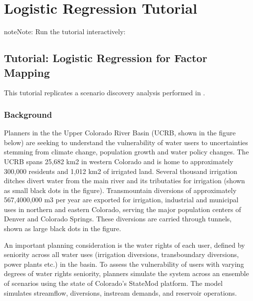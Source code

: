 \documentclass[letterpaper,10pt,english]{book}
\let\sphinxpxdimen\pdfpxdimen\else\newdimen\sphinxpxdimen
\begin{document}
\section{Logistic Regression Tutorial}
\label{\detokenize{A2_Jupyter_Notebooks:logistic-regression-tutorial}}
\begin{sphinxadmonition}{note}{Note:}
\sphinxAtStartPar
Run the tutorial interactively:  
\end{sphinxadmonition}


\subsection{Tutorial: Logistic Regression for Factor Mapping}
\label{\detokenize{A2_Jupyter_Notebooks:tutorial-logistic-regression-for-factor-mapping}}
\sphinxAtStartPar
This tutorial replicates a scenario discovery analysis performed in
.


\subsubsection{Background}
\label{\detokenize{A2_Jupyter_Notebooks:background}}
\sphinxAtStartPar
Planners in the the Upper Colorado River Basin (UCRB, shown in the
figure below) are seeking to understand the vulnerability of water users
to uncertainties stemming from climate change, population growth and
water policy changes. The UCRB spans 25,682 km2 in western Colorado and
is home to approximately 300,000 residents and 1,012 km2 of irrigated
land. Several thousand irrigation ditches divert water from the main
river and its tributaties for irrigation (shown as small black dots in
the figure). Transmountain diversions of approximately 567,4000,000 m3
per year are exported for irrigation, industrial and municipal uses in
northern and eastern Colorado, serving the major population centers of
Denver and Colorado Springs. These diversions are carried through
tunnels, shown as large black dots in the figure.

\noindent\sphinxincludegraphics[width=1278\sphinxpxdimen,height=803\sphinxpxdimen]{{basin_map}.png}

\sphinxAtStartPar
An important planning consideration is the water rights of each user,
defined by seniority across all water uses (irrigation diversions,
transboundary diversions, power plants etc.) in the basin. To assess the
vulnerability of users with varying degrees of water rights seniority,
planners simulate the system across an ensemble of scenarios using the
state of Colorado’s StateMod platform. The model simulates streamflow,
diversions, instream demands, and reservoir operations.
\end{document}
